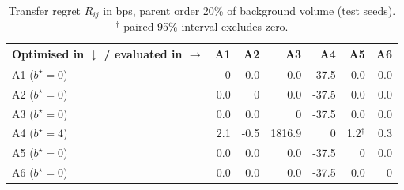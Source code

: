 \begin{table}[H]
\centering\footnotesize
\caption{Transfer regret $R_{ij}$ in bps, parent order 20\% of background volume (test seeds). $^\dagger$ paired 95\% interval excludes zero.}\label{tab:regret20}
\begin{tabular}{lrrrrrr}
\toprule
Optimised in $\downarrow$ / evaluated in $\rightarrow$ & A1 & A2 & A3 & A4 & A5 & A6 \\
\midrule
A1 ($b^\star\!=\!0$) & 0 & 0.0 & 0.0 & -37.5 & 0.0 & 0.0 \\
A2 ($b^\star\!=\!0$) & 0.0 & 0 & 0.0 & -37.5 & 0.0 & 0.0 \\
A3 ($b^\star\!=\!0$) & 0.0 & 0.0 & 0 & -37.5 & 0.0 & 0.0 \\
A4 ($b^\star\!=\!4$) & 2.1 & -0.5 & 1816.9 & 0 & 1.2$^\dagger$ & 0.3 \\
A5 ($b^\star\!=\!0$) & 0.0 & 0.0 & 0.0 & -37.5 & 0 & 0.0 \\
A6 ($b^\star\!=\!0$) & 0.0 & 0.0 & 0.0 & -37.5 & 0.0 & 0 \\
\bottomrule
\end{tabular}
\end{table}
